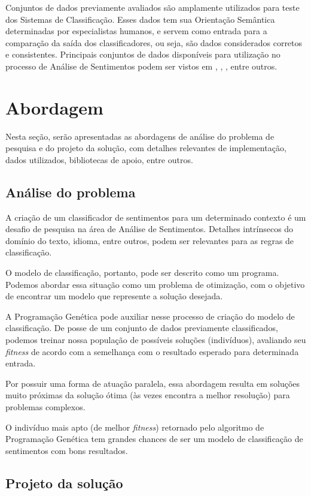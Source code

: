 \documentclass[12pt]{article}
\begin{document}
Conjuntos de dados previamente avaliados são amplamente utilizados para teste dos Sistemas de Classificação. Esses dados tem sua Orientação Semântica determinadas por especialistas humanos, e servem como entrada para a comparação da saída dos classificadores, ou seja, são dados considerados corretos e consistentes. Principais conjuntos de dados disponíveis para utilização no processo de Análise de Sentimentos podem ser vistos em \cite{HuAndLiu2004}, \cite{Iqbal}, \cite{taboada2011lexicon}, entre outros. 


\section{Abordagem}
Nesta seção, serão apresentadas as abordagens de análise do problema de pesquisa e do projeto da solução, com detalhes relevantes de implementação, dados utilizados, bibliotecas de apoio, entre outros.

\subsection{Análise do problema}

A criação de um classificador de sentimentos para um determinado contexto é um desafio de pesquisa na área de Análise de Sentimentos. Detalhes intrínsecos do domínio do texto, idioma, entre outros, podem ser relevantes para as regras de classificação. 

O modelo de classificação, portanto, pode ser descrito como um programa. Podemos abordar essa situação como um problema de otimização, com o objetivo de encontrar um modelo que represente a solução desejada.

A Programação Genética pode auxiliar nesse processo de criação do modelo de classificação. De posse de um conjunto de dados previamente classificados, podemos treinar nossa população de possíveis soluções (indivíduos), avaliando seu \emph{fitness} de acordo com a semelhança com o resultado esperado para determinada entrada.

Por possuir uma forma de atuação paralela, essa abordagem resulta em soluções muito próximas da solução ótima (às vezes encontra a melhor resolução) para problemas complexos.

O indivíduo mais apto (de melhor \emph{fitness}) retornado pelo algoritmo de Programação Genética tem grandes chances de ser um modelo de classificação de sentimentos com bons resultados.

\subsection{Projeto da solução}
\end{document}
